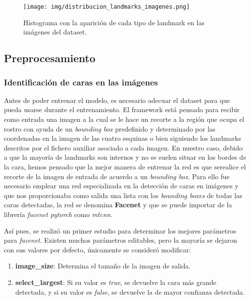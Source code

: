             \begin{figure}[!h]
                \centering
                \texttt{[image: img/distribucion\_landmarks\_imagenes.png]}
                \caption{Histograma con la aparición de cada tipo de landmark en las imágenes del dataset.}
                \label{fig:Histograma}
            \end{figure}
    
    \subsection{Preprocesamiento}
        
        \subsubsection{Identificación de caras en las imágenes}
            \noindent Antes de poder entrenar el modelo, es necesario adecuar el dataset para que pueda usarse durante el entrenamiento. El framework está pensado para recibir como entrada una imagen a la cual se le hace un recorte a la región que ocupa el rostro con ayuda de un \textit{bounding box} predefinido y determinado por las coordenadas en la imagen de las cuatro esquinas o bien siguiendo los landmarks descritos por el fichero auxiliar asociado a cada imagen. En nuestro caso, debido a que la mayoría de landmarks son internos y no se suelen situar en los bordes de la cara, hemos pensado que la mejor manera de entrenar la red es que serealice el recorte de la imagen de entrada de acuerdo a un \textit{bounding box}. Para ello fue necesario emplear una red especializada en la detección de caras en imágenes y que nos proporcionaba como salida una lista con los \textit{bounding boxes} de todas las caras detectadas, la red se denomina \textbf{Facenet} y que se puede importar de la librería \textit{facenet pytorch} como \textit{mtcnn}.

            \medskip

            \noindent Así pues, se realizó un primer estudio para determinar los mejores parámetros para \textit{facenet}. Existen muchos parámetros editables, pero la mayoría se dejaron con sus valores por defecto, únicamente se consideró modificar: 

            \begin{enumerate}
                \item \textbf{image\_size}: Determina el tamaño de la imagen de salida.
                \item \textbf{select\_largest}: Si su valor es \textit{true}, se devuelve la cara más grande detectada, y si su valor es \textit{false}, se devuelve la de mayor confianza detectada.
            \end{enumerate}


